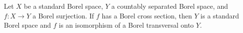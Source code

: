 Let $X$ be a standard Borel space, $Y$ a countably separated Borel space, and $f: X \to Y$ a Borel surjection. If $f$ has a Borel cross section, then $Y$ is a standard Borel space and $f$ is an isomorphism of a Borel transversal onto $Y$.
